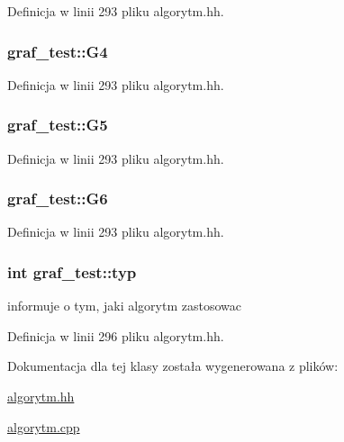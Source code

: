 Definicja w linii 293 pliku algorytm.\-hh.

\hypertarget{classgraf__test_acdda3ab9733fc4d62802fdf2f3872da5}{
\subsubsection[{G4}]{ graf\-\_\-test\-::\-G4\hspace{0.3cm}{\ttfamily [private]}}}\label{classgraf__test_acdda3ab9733fc4d62802fdf2f3872da5}


Definicja w linii 293 pliku algorytm.\-hh.

\hypertarget{classgraf__test_a1ed75824208bf907bf0c80de05046b49}{
\subsubsection[{G5}]{ graf\-\_\-test\-::\-G5\hspace{0.3cm}{\ttfamily [private]}}}\label{classgraf__test_a1ed75824208bf907bf0c80de05046b49}


Definicja w linii 293 pliku algorytm.\-hh.

\hypertarget{classgraf__test_a01b58fa6f7b1a36c0239e65d9c6b87a0}{
\subsubsection[{G6}]{ graf\-\_\-test\-::\-G6\hspace{0.3cm}{\ttfamily [private]}}}\label{classgraf__test_a01b58fa6f7b1a36c0239e65d9c6b87a0}


Definicja w linii 293 pliku algorytm.\-hh.

\hypertarget{classgraf__test_a0d14d8d811514d102e082a2dc52a4813}{
\subsubsection[{typ}]{\setlength{\rightskip}{0pt plus 5cm}int graf\-\_\-test\-::typ}}\label{classgraf__test_a0d14d8d811514d102e082a2dc52a4813}


informuje o tym, jaki algorytm zastosowac 



Definicja w linii 296 pliku algorytm.\-hh.



Dokumentacja dla tej klasy została wygenerowana z plików\-:\begin{DoxyCompactItemize}
\item 
\hyperlink{algorytm_8hh}{algorytm.\-hh}\item 
\hyperlink{algorytm_8cpp}{algorytm.\-cpp}\end{DoxyCompactItemize}
